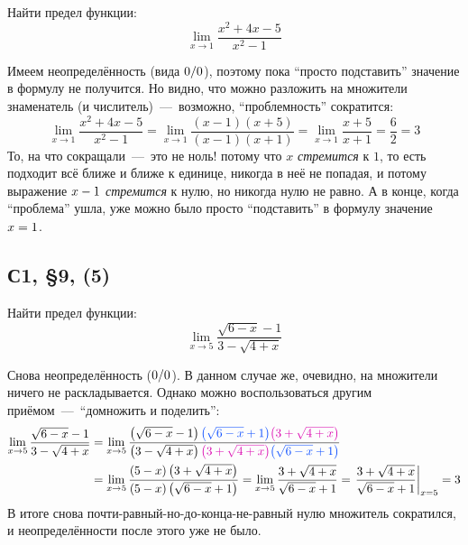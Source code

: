 \documentclass[a4paper,12pt]{article}
\begin{document}
  Найти предел функции:
  \[
    \lim_{x \to 1} \frac{x^2 + 4x - 5}{x^2 - 1}
  \]
  
  \begin{solution}
    Имеем неопределённость (вида $0 \hm/ 0$), поэтому пока ``просто подставить'' значение в формулу не получится.
    Но видно, что можно разложить на множители знаменатель (и числитель)~---~возможно, ``проблемность'' сократится:
    \[
      \lim_{x \to 1} \frac{x^2 + 4x - 5}{x^2 - 1}
        = \lim_{x \to 1} \frac{(x - 1) (x + 5)}{(x - 1) (x + 1)}
        = \lim_{x \to 1} \frac{x + 5}{x + 1}
        = \frac{6}{2} = 3
    \]
    То, на что сокращали~---~это не ноль! потому что $x$ \emph{стремится} к $1$, то есть подходит всё ближе и ближе к единице, никогда в неё не попадая, и потому выражение $x \hm- 1$ \emph{стремится} к нулю, но никогда нулю не равно.
    А в конце, когда ``проблема'' ушла, уже можно было просто ``подставить'' в формулу значение $x \hm= 1$.
  \end{solution}


  \subsection{С1, \S 9, (5)}

  Найти предел функции:
  \[
    \lim_{x \to 5} \frac{\sqrt{6 - x} - 1}{3 - \sqrt{4 + x}}
  \]
  
  \begin{solution}
    Снова неопределённость ($0 \hm/ 0$).
    В данном случае же, очевидно, на множители ничего не раскладывается.
    Однако можно воспользоваться другим приёмом~---~``домножить и поделить'':
    \begin{equation*}
    \begin{split}
      \lim_{x \to 5} \frac{\sqrt{6 - x} - 1}{3 - \sqrt{4 + x}}
        &= \lim_{x \to 5} \frac{\left(\sqrt{6 - x} - 1\right) \textcolor{blue}{\left(\sqrt{6 - x} + 1\right)} \textcolor{pink}{\left(3 + \sqrt{4 + x}\right)}}{\left(3 - \sqrt{4 + x}\right) \textcolor{pink}{\left(3 + \sqrt{4 + x}\right)} \textcolor{blue}{\left(\sqrt{6 - x} + 1\right)}}\\
        &= \lim_{x \to 5} \frac{(5 - x) \left(3 + \sqrt{4 + x}\right)}{(5 - x) \left(\sqrt{6 - x} + 1\right)}
        = \lim_{x \to 5} \frac{3 + \sqrt{4 + x}}{\sqrt{6 - x} + 1}
        = \left.\frac{3 + \sqrt{4 + x}}{\sqrt{6 - x} + 1}\right|_{x = 5}
        = 3
    \end{split}
    \end{equation*}
    В итоге снова почти-равный-но-до-конца-не-равный нулю множитель сократился, и неопределённости после этого уже не было.
  \end{solution}
\end{document}
